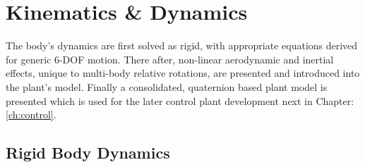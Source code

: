 \chapter{Kinematics \& Dynamics}
\label{ch:dynamics}
The body's dynamics are first solved as rigid, with appropriate equations derived for generic 6-DOF motion. There after, non-linear aerodynamic and inertial effects, unique to multi-body relative rotations, are presented and introduced into the plant's model. Finally a consolidated, quaternion based plant model is presented which is used for the later control plant development next in Chapter:\ref{ch:control}.
\section{Rigid Body Dynamics}
\label{sec:dynamics.rigidbody}
